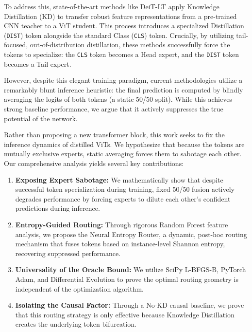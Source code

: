 \documentclass[10pt,twocolumn,letterpaper]{article}
\begin{document}
To address this, state-of-the-art methods like DeiT-LT \cite{venkateshbabu2024deitlt} apply Knowledge Distillation (KD) \cite{hinton2015distilling} to transfer robust feature representations from a pre-trained CNN teacher to a ViT student. This process introduces a specialized Distillation (\texttt{DIST}) token alongside the standard Class (\texttt{CLS}) token. Crucially, by utilizing tail-focused, out-of-distribution distillation, these methods successfully force the tokens to specialize: the \texttt{CLS} token becomes a Head expert, and the \texttt{DIST} token becomes a Tail expert. 

However, despite this elegant training paradigm, current methodologies utilize a remarkably blunt inference heuristic: the final prediction is computed by blindly averaging the logits of both tokens (a static 50/50 split). While this achieves strong baseline performance, we argue that it actively suppresses the true potential of the network.

Rather than proposing a new transformer block, this work seeks to fix the inference dynamics of distilled ViTs. We hypothesize that because the tokens are mutually exclusive experts, static averaging forces them to sabotage each other. Our comprehensive analysis yields several key contributions:

\begin{enumerate}
    \item \textbf{Exposing Expert Sabotage:} We mathematically show that despite successful token specialization during training, fixed 50/50 fusion actively degrades performance by forcing experts to dilute each other's confident predictions during inference.
    \item \textbf{Entropy-Guided Routing:} Through rigorous Random Forest feature analysis, we propose the Neural Entropy Router, a dynamic, post-hoc routing mechanism that fuses tokens based on instance-level Shannon entropy, recovering suppressed performance.
    \item \textbf{Universality of the Oracle Bound:} We utilize SciPy L-BFGS-B, PyTorch Adam, and Differential Evolution to prove the optimal routing geometry is independent of the optimization algorithm.
    \item \textbf{Isolating the Causal Factor:} Through a No-KD causal baseline, we prove that this routing strategy is only effective because Knowledge Distillation creates the underlying token bifurcation.
\end{enumerate}
\end{document}

